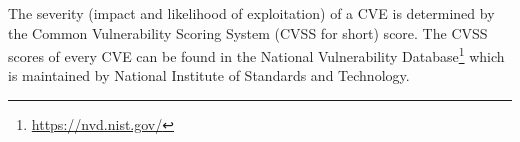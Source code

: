 The severity (impact and likelihood of exploitation) of a CVE is determined by the Common Vulnerability Scoring System (CVSS for short) score. The CVSS scores of every CVE can be found in the National Vulnerability Database\footnote{\url{https://nvd.nist.gov/}} which is maintained by National Institute of Standards and Technology.








